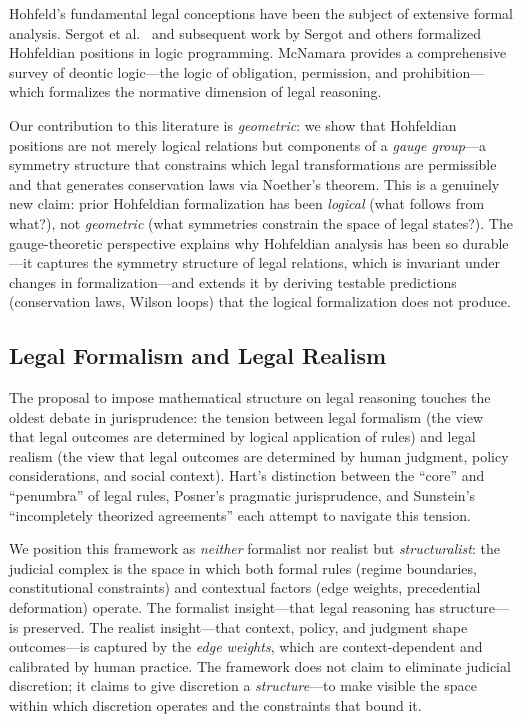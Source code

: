 \documentclass[12pt]{article}
\theoremstyle{definition}
\theoremstyle{remark}
\begin{document}
Hohfeld's fundamental legal conceptions \cite{hohfeld1913,hohfeld1917} have been the subject of extensive formal analysis.  Sergot et al.\ \cite{sergot1986} and subsequent work by Sergot and others formalized Hohfeldian positions in logic programming.  McNamara \cite{mcnamara2014} provides a comprehensive survey of deontic logic---the logic of obligation, permission, and prohibition---which formalizes the normative dimension of legal reasoning.

Our contribution to this literature is \emph{geometric}: we show that Hohfeldian positions are not merely logical relations but components of a \emph{gauge group}---a symmetry structure that constrains which legal transformations are permissible and that generates conservation laws via Noether's theorem.  This is a genuinely new claim: prior Hohfeldian formalization has been \emph{logical} (what follows from what?), not \emph{geometric} (what symmetries constrain the space of legal states?).  The gauge-theoretic perspective explains why Hohfeldian analysis has been so durable---it captures the symmetry structure of legal relations, which is invariant under changes in formalization---and extends it by deriving testable predictions (conservation laws, Wilson loops) that the logical formalization does not produce.

\subsection{Legal Formalism and Legal Realism}

The proposal to impose mathematical structure on legal reasoning touches the oldest debate in jurisprudence: the tension between legal formalism (the view that legal outcomes are determined by logical application of rules) and legal realism (the view that legal outcomes are determined by human judgment, policy considerations, and social context).  Hart's \cite{hart1961} distinction between the ``core'' and ``penumbra'' of legal rules, Posner's \cite{posner1990} pragmatic jurisprudence, and Sunstein's \cite{sunstein1996} ``incompletely theorized agreements'' each attempt to navigate this tension.

We position this framework as \emph{neither} formalist nor realist but \emph{structuralist}: the judicial complex is the space in which both formal rules (regime boundaries, constitutional constraints) and contextual factors (edge weights, precedential deformation) operate.  The formalist insight---that legal reasoning has structure---is preserved.  The realist insight---that context, policy, and judgment shape outcomes---is captured by the \emph{edge weights}, which are context-dependent and calibrated by human practice.  The framework does not claim to eliminate judicial discretion; it claims to give discretion a \emph{structure}---to make visible the space within which discretion operates and the constraints that bound it.
\end{document}
